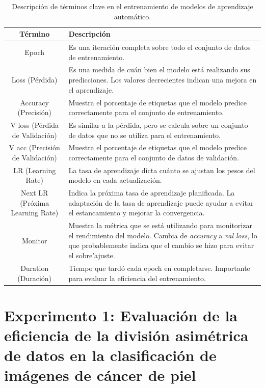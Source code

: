 \begin{table}[ht]
   \centering
   \small
   \begin{tabular}{|c|p{10cm}|}
   \hline
   \textbf{Término} & \textbf{Descripción} \\
   \hline
   Epoch & Es una iteración completa sobre todo el conjunto de datos de entrenamiento. \\
   \hline
   Loss (Pérdida) & Es una medida de cuán bien el modelo está realizando sus predicciones. Los valores decrecientes indican una mejora en el aprendizaje. \\
   \hline
   Accuracy (Precisión) & Muestra el porcentaje de etiquetas que el modelo predice correctamente para el conjunto de entrenamiento. \\
   \hline
   V loss (Pérdida de Validación) & Es similar a la pérdida, pero se calcula sobre un conjunto de datos que no se utiliza para el entrenamiento. \\
   \hline
   V acc (Precisión de Validación) & Muestra el porcentaje de etiquetas que el modelo predice correctamente para el conjunto de datos de validación. \\
   \hline
   LR (Learning Rate) & La tasa de aprendizaje dicta cuánto se ajustan los pesos del modelo en cada actualización. \\
   \hline
   Next LR (Próxima Learning Rate) & Indica la próxima tasa de aprendizaje planificada. La adaptación de la tasa de aprendizaje puede ayudar a evitar el estancamiento y mejorar la convergencia. \\
   \hline
   Monitor & Muestra la métrica que se está utilizando para monitorizar el rendimiento del modelo. Cambia de \textit{accuracy} a \textit{val loss}, lo que probablemente indica que el cambio se hizo para evitar el sobre'ajuste. \\
   \hline
   Duration (Duración) & Tiempo que tardó cada epoch en completarse. Importante para evaluar la eficiencia del entrenamiento. \\
   \hline
   \end{tabular}
   \caption{Descripción de términos clave en el entrenamiento de modelos de aprendizaje automático.}
   \label{table:terminology}
   \end{table}
   

\section{Experimento 1: Evaluación de la eficiencia de la división asimétrica de datos en la clasificación de imágenes de cáncer de piel}\label{subsec:exp1}


